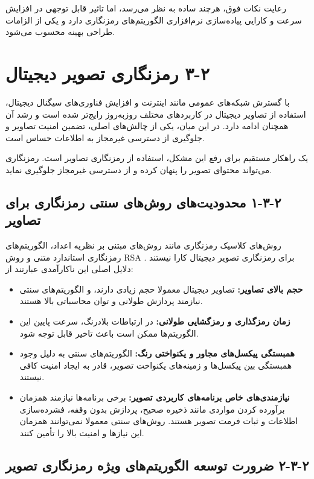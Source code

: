 رعایت نکات فوق، هرچند ساده به نظر می‌رسد، اما تاثیر قابل توجهی در افزایش سرعت و کارایی پیاده‌سازی نرم‌افزاری الگوریتم‌های رمزنگاری دارد و یکی از الزامات طراحی بهینه محسوب می‌شود.

\section{‏۲‏-‏۳‏ رمزنگاری تصویر دیجیتال}

با گسترش شبکه‌های عمومی مانند اینترنت و افزایش فناوری‌های سیگنال دیجیتال، استفاده از تصاویر دیجیتال در کاربردهای مختلف روزبه‌روز رایج‌تر شده است و رشد آن همچنان ادامه دارد\cite{ref39}. در این میان، یکی از چالش‌های اصلی، تضمین امنیت تصاویر و جلوگیری از دسترسی غیرمجاز به اطلاعات حساس است.

یک راهکار مستقیم برای رفع این مشکل، استفاده از رمزنگاری تصاویر است. رمزنگاری می‌تواند محتوای تصویر را پنهان کرده و از دسترسی غیرمجاز جلوگیری نماید.

\subsection{‏۲‏-‏۳‏-‏۱‏ محدودیت‌های روش‌های سنتی رمزنگاری برای تصاویر}

روش‌های کلاسیک رمزنگاری مانند روش‌های مبتنی بر نظریه اعداد، الگوریتم‌های رمزنگاری استاندارد متنی و روش RSA برای رمزنگاری تصویر دیجیتال کارا نیستند \cite{ref40}. دلایل اصلی این ناکارآمدی عبارتند از:

\begin{itemize}
    \item \textbf{حجم بالای تصاویر:} تصاویر دیجیتال معمولا حجم زیادی دارند، و الگوریتم‌های سنتی نیازمند پردازش طولانی و توان محاسباتی بالا هستند.
    \item \textbf{زمان رمزگذاری و رمزگشایی طولانی:} در ارتباطات بلادرنگ، سرعت پایین این الگوریتم‌ها ممکن است باعث تاخیر قابل توجه شود.
    \item \textbf{همبستگی پیکسل‌های مجاور و یکنواختی رنگ:} الگوریتم‌های سنتی به دلیل وجود همبستگی بین پیکسل‌ها و زمینه‌های یکنواخت تصویر، قادر به ایجاد امنیت کافی نیستند.
    \item \textbf{نیازمندی‌های خاص برنامه‌های کاربردی تصویر:} برخی برنامه‌ها نیازمند همزمان برآورده کردن مواردی مانند ذخیره صحیح، پردازش بدون وقفه، فشرده‌سازی اطلاعات و ثبات فرمت تصویر هستند. روش‌های سنتی معمولا نمی‌توانند همزمان این نیازها و امنیت بالا را تأمین کنند.
\end{itemize}

\subsection{‏۲‏-‏۳‏-‏۲‏ ضرورت توسعه الگوریتم‌های ویژه رمزنگاری تصویر}

